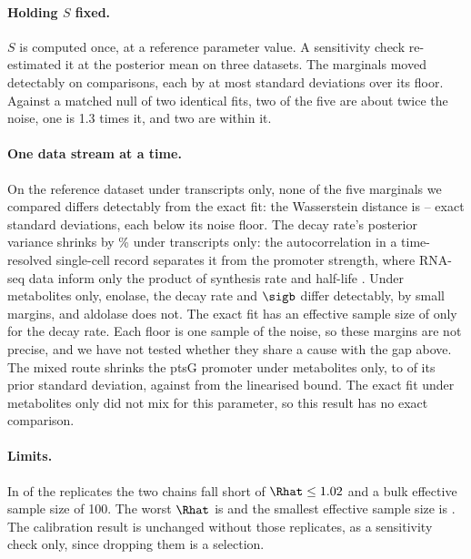 \paragraph{Holding $S$ fixed.} $S$ is computed once, at a reference parameter value.
A sensitivity check re-estimated it at the posterior mean on three datasets. The
marginals moved detectably on  comparisons, each by at most
 standard deviations over its floor. Against a matched null of two
identical fits, two of the five are about twice the noise, one is 1.3 times it, and
two are within it.

\paragraph{One data stream at a time.} On the reference dataset under transcripts only,
none of the five marginals we compared differs detectably from the exact fit: the
Wasserstein distance is -- exact standard deviations, each
below its noise floor. The decay rate's posterior variance shrinks by \% under transcripts only:
the autocorrelation in a time-resolved single-cell record separates it from the promoter
strength, where RNA-seq data inform only the product of synthesis rate and half-life \cite{karr2015summary}.
Under metabolites only, enolase, the decay rate and $\sigb$
differ detectably, by small margins, and aldolase does not. The exact fit has an
effective sample size of only  for the decay rate. Each floor is one sample of the
noise, so these margins are not precise, and we have not tested whether they share a
cause with the gap above.
The mixed route shrinks the ptsG promoter under metabolites only, to 
of its prior standard deviation, against  from the linearised bound.
The exact fit under metabolites only did not mix for this parameter, so this result has
no exact comparison.

\paragraph{Limits.} In  of the  replicates the two chains
fall short of $\Rhat \le 1.02$ and a bulk effective sample size of 100. The worst
$\Rhat$ is  and the smallest effective sample size is . The
calibration result is unchanged without those replicates, as a sensitivity check only, since dropping them is a selection.

